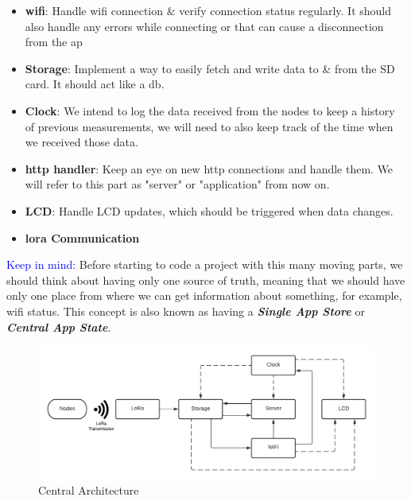 \begin{itemize}
    \item \textbf{\acrshort{wifi}}: Handle \acrshort{wifi} connection \& verify connection status regularly. It should also handle any errors while connecting or that can cause a disconnection from the \acrfull{ap}
    \item \textbf{Storage}: Implement a way to easily fetch and write data to \& from the SD card. It should act like a \acrshort{db}.
    \item \textbf{Clock}: We intend to log the data received from the nodes to keep a history of previous measurements, we will need to also keep track of the time when we received those data.
    \item \textbf{\acrshort{http} handler}: Keep an eye on new \acrshort{http} connections and handle them. We will refer to this part as "server" or "application" from now on.
    \item \textbf{LCD}: Handle LCD updates, which should be triggered when data changes.
    \item \textbf{\acrshort{lora} Communication}
\end{itemize}

\textcolor{blue}{Keep in mind:} Before starting to code a project with this many moving parts, we should think about having only one source of truth, meaning that we should have only one place from where we can get information about something, for example, \acrshort{wifi} status. This concept is also known as having a \textbf{\textit{Single App Store}} or \textbf{\textit{Central App State}}. \\

\begin{figure}[H]
    \centering
    \includegraphics[width=\textwidth]{images/architecture.png}
    \caption{Central Architecture}
\end{figure}

\newcommand\dashto{\mathrel{
  -\mkern-6mu{\to}\mkern-20mu{\color{white}\bullet}\mkern12mu
}}

